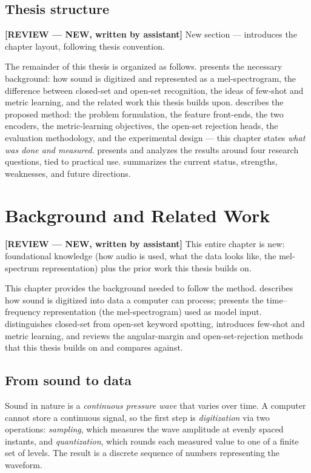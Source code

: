 \documentclass[12pt,a4paper]{report}
\newcommand{\reviewnote}[1]{%
    \par\smallskip\noindent
    \colorbox{yellow!35}{\parbox{0.97\linewidth}{\small\textbf{[REVIEW — NEW, written by assistant]}\; #1}}%
    \par\smallskip}
\newcommand{\reviewnote}[1]{}
\begin{document}
\section{Thesis structure}\label{sec:thesisstruct}
\reviewnote{New section --- introduces the chapter layout, following thesis
convention.}

The remainder of this thesis is organized as follows. 
presents the necessary background: how sound is digitized and represented as a
mel-spectrogram, the difference between closed-set and open-set recognition, the
ideas of few-shot and metric learning, and the related work this thesis builds
upon.  describes the proposed method: the problem formulation,
the feature front-ends, the two encoders, the metric-learning objectives, the
open-set rejection heads, the evaluation methodology, and the experimental design
--- this chapter states \emph{what was done and measured}.
 presents and analyzes the results around four research
questions, tied to practical use. 
summarizes the current status, strengths, weaknesses, and future directions.

\chapter{Background and Related Work}\label{ch:background}
\reviewnote{This entire chapter is new: foundational knowledge (how audio is
used, what the data looks like, the mel-spectrum representation) plus the prior
work this thesis builds on.}

This chapter provides the background needed to follow the method.
 describes how sound is digitized into data a computer can
process;  presents the time--frequency representation (the
mel-spectrogram) used as model input.  distinguishes closed-set
from open-set keyword spotting,  introduces few-shot and
metric learning, and  reviews the angular-margin and
open-set-rejection methods that this thesis builds on and compares against.

\section{From sound to data}\label{sec:sound2data}

Sound in nature is a \emph{continuous pressure wave} that varies over time. A
computer cannot store a continuous signal, so the first step is
\emph{digitization} via two operations: \emph{sampling}, which measures the wave
amplitude at evenly spaced instants, and \emph{quantization}, which rounds each
measured value to one of a finite set of levels. The result is a discrete
sequence of numbers representing the waveform.
\end{document}
